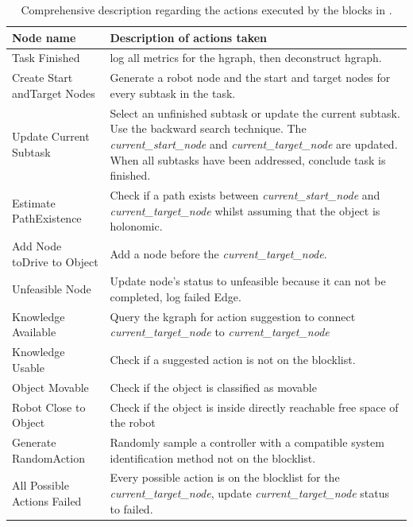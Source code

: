 \begin{table}[H]
\caption{Comprehensive description regarding the actions executed by the blocks in .}%
\label{table:explainer_hgraph_figures_nodes}
\centering
{}
\begin{tabular}%
  {>{\raggedright\arraybackslash}p{}%
    >{\raggedright\arraybackslash}p{}}
\textbf{Node name} & \textbf{Description of actions taken}\\\toprule
Task Finished & log all metrics for the \ac{hgraph}, then deconstruct \ac{hgraph}.\\
Create Start and\newline Target Nodes & Generate a robot node and the start and target nodes for every subtask in the task.\\
Update Current Subtask & Select an unfinished subtask or update the current subtask. Use the backward search technique. The \textit{current\_start\_node} and \textit{current\_target\_node} are updated. When all subtasks have been addressed, conclude task is finished. \\
Estimate Path\newline Existence & Check if a path exists between \textit{current\_start\_node} and \textit{current\_target\_node} whilst assuming that the object is holonomic.\\
Add Node to\newline Drive to Object & Add a node before the \textit{current\_target\_node}.\\
Unfeasible Node & Update node's status to unfeasible because it can not be completed, log failed Edge.\\
Knowledge Available& Query the \ac{kgraph} for action suggestion to connect \textit{current\_target\_node} to \textit{current\_target\_node}\\
Knowledge Usable& Check if a suggested action is not on the blocklist.\\
Object Movable & Check if the object is classified as movable\\
Robot Close to Object& Check if the object is inside directly reachable free space of the robot \\
Generate Random\newline Action& Randomly sample a controller with a compatible system identification method not on the blocklist. \\
All Possible Actions Failed & Every possible action is on the blocklist for the \textit{current\_target\_node}, update \textit{current\_target\_node} status to failed.\\

\end{tabular}
\end{table}

